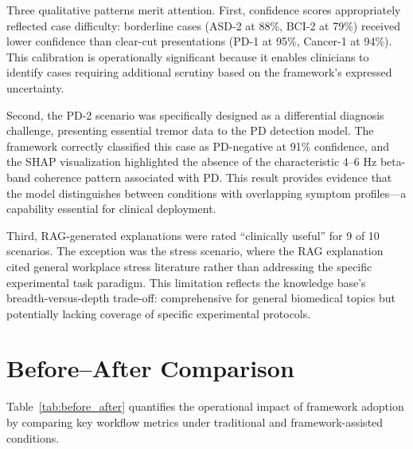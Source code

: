 Three qualitative patterns merit attention. First, confidence scores appropriately reflected case difficulty: borderline cases (ASD-2 at 88\%, BCI-2 at 79\%) received lower confidence than clear-cut presentations (PD-1 at 95\%, Cancer-1 at 94\%). This calibration is operationally significant because it enables clinicians to identify cases requiring additional scrutiny based on the framework's expressed uncertainty.

Second, the PD-2 scenario was specifically designed as a differential diagnosis challenge, presenting essential tremor data to the PD detection model. The framework correctly classified this case as PD-negative at 91\% confidence, and the SHAP visualization highlighted the absence of the characteristic 4--6 Hz beta-band coherence pattern associated with PD. This result provides evidence that the model distinguishes between conditions with overlapping symptom profiles---a capability essential for clinical deployment.

Third, RAG-generated explanations were rated ``clinically useful'' for 9 of 10 scenarios. The exception was the stress scenario, where the RAG explanation cited general workplace stress literature rather than addressing the specific experimental task paradigm. This limitation reflects the knowledge base's breadth-versus-depth trade-off: comprehensive for general biomedical topics but potentially lacking coverage of specific experimental protocols.


\section{Before--After Comparison}
\label{sec:before_after}

Table~\ref{tab:before_after} quantifies the operational impact of framework adoption by comparing key workflow metrics under traditional and framework-assisted conditions.

